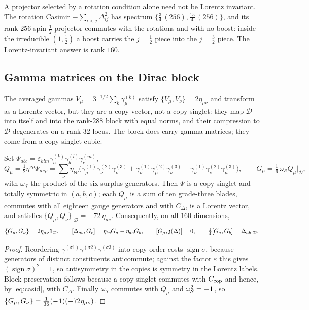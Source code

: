 A projector selected by a rotation condition alone need not be Lorentz invariant. The rotation Casimir $-\sum_{i<j}\Delta_{ij}^2$ has spectrum
$\{\tfrac34\,(256),\tfrac{15}4\,(256)\}$, and its rank-$256$ spin-$\tfrac12$ projector commutes with the rotations and with no boost: inside the
irreducible $(1,\tfrac12)$ a boost carries the $j=\tfrac12$ piece into the $j=\tfrac32$ piece. The Lorentz-invariant answer is rank $160$.

\subsection{Gamma matrices on the Dirac block}

The averaged gammas $V_\mu=3^{-1/2}\sum_k\gamma^{(k)}_\mu$ satisfy $\{V_\mu,V_\nu\}=2\eta_{\mu\nu}$ and transform as a Lorentz vector, but they are a
copy vector, not a copy singlet: they map $\mathcal D$ into itself and into the rank-$288$ block with equal norms, and their compression to
$\mathcal D$ degenerates on a rank-$32$ locus. The block does carry gamma matrices; they come from a copy-singlet cubic.

\begin{theorem}
\label{thm:blockgamma}
Set $\Psi_{abc}=\varepsilon_{klm}\gamma^{(k)}_a\gamma^{(l)}_b\gamma^{(m)}_c$,
\[
Q_\mu=\tfrac12\eta^{\nu\rho}\Psi_{\mu\nu\rho}
=\sum_\nu\eta_{\nu\nu}\bigl(\gamma^{(1)}_\mu\gamma^{(2)}_\nu\gamma^{(3)}_\nu+\gamma^{(1)}_\nu\gamma^{(2)}_\mu\gamma^{(3)}_\nu+\gamma^{(1)}_\nu\gamma^{(2)}_\nu\gamma^{(3)}_\mu\bigr),
\qquad
G_\mu=\tfrac16\,\omega_{\mathcal S}Q_\mu\big|_{\mathcal D},
\]
with $\omega_{\mathcal S}$ the product of the six surplus generators. Then $\Psi$ is a copy singlet and totally symmetric in $(a,b,c)$; each $Q_\mu$
is a sum of ten grade-three blades, commutes with all eighteen gauge generators and with $C_\Delta$, is a Lorentz vector, and satisfies
$\{Q_\mu,Q_\nu\}|_{\mathcal D}=-72\,\eta_{\mu\nu}$. Consequently, on all $160$ dimensions,
\[
\{G_\mu,G_\nu\}=2\eta_{\mu\nu}\mathbf 1_{\mathcal D},\qquad [\Delta_{ab},G_c]=\eta_{bc}G_a-\eta_{ac}G_b,\qquad [G_\mu,\mathfrak z(\Delta)]=0,\qquad
\tfrac14[G_a,G_b]=\Delta_{ab}|_{\mathcal D}.
\]
\end{theorem}

\begin{proof}
Reordering $\gamma^{(\sigma1)}\gamma^{(\sigma2)}\gamma^{(\sigma3)}$ into copy order costs $\operatorname{sign}\sigma$, because generators of distinct
constituents anticommute; against the factor $\varepsilon$ this gives $(\operatorname{sign}\sigma)^2=1$, so antisymmetry in the copies is symmetry
in the Lorentz labels. Block preservation follows because a copy singlet commutes with $C_{\rm cop}$ and hence, by \eqref{eq:casid}, with
$C_\Delta$. Finally $\omega_{\mathcal S}$ commutes with $Q_\mu$ and $\omega_{\mathcal S}^2=-\mathbf 1$, so $\{G_\mu,G_\nu\}=\tfrac1{36}(-\mathbf 1)(-72\eta_{\mu\nu})$.
\end{proof}

